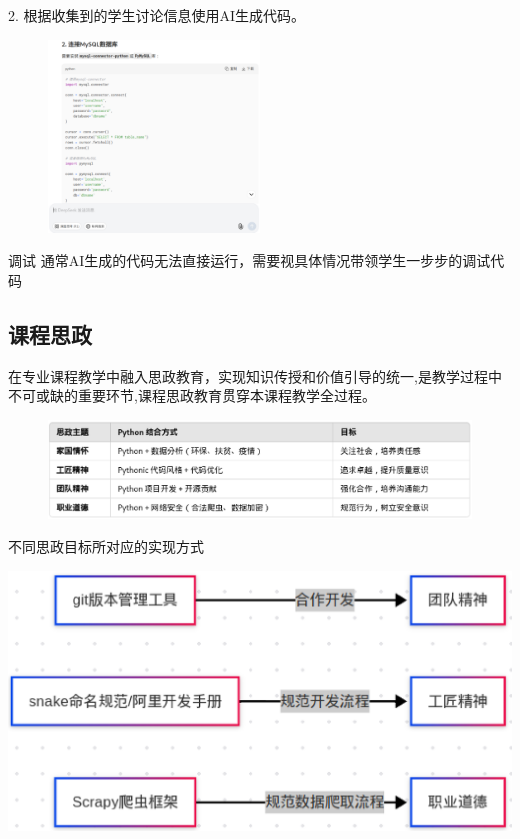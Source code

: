 \documentclass{beamer}
\begin{document}
\begin{frame}[t]

	2. 根据收集到的学生讨论信息使用AI生成代码。
	\pause
	\begin{figure}[htpb]
		\centering
		\includegraphics[width=0.5\textwidth]{deepseek.eps}
		\label{fig:deepseek-eps}
	\end{figure}
	\pause
	\begin{alertblock}{调试}
		通常AI生成的代码无法直接运行，需要视具体情况带领学生一步步的调试代码

	\end{alertblock}

\end{frame}
\subsection{课程思政}

\begin{frame}[t]
	在专业课程教学中融入思政教育，实现知识传授和价值引导的统一,是教学过程中不可或缺的重要环节,课程思政教育贯穿本课程教学全过程。
	\begin{figure}[htbp]
		\begin{center}
			\includegraphics[width=0.9\linewidth]{policy.eps}
		\end{center}
	\end{figure}
	\pause
	不同思政目标所对应的实现方式
	\begin{center}
		\includegraphics[width=0.5\linewidth]{tools_for_policy.eps}
	\end{center}
\end{frame}
\end{document}
